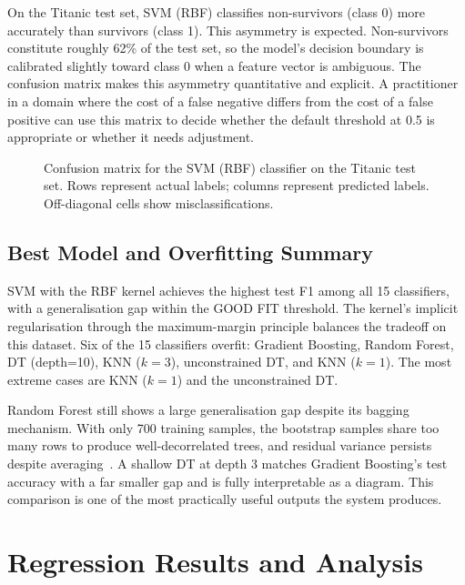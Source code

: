 \documentclass[conference]{IEEEtran}
\begin{document}
On the Titanic test set, SVM (RBF) classifies non-survivors (class 0) more accurately than survivors (class 1). This asymmetry is expected. Non-survivors constitute roughly 62\% of the test set, so the model's decision boundary is calibrated slightly toward class 0 when a feature vector is ambiguous. The confusion matrix makes this asymmetry quantitative and explicit. A practitioner in a domain where the cost of a false negative differs from the cost of a false positive can use this matrix to decide whether the default threshold at 0.5 is appropriate or whether it needs adjustment.

\begin{figure}[t]
    \centering
    \caption{Confusion matrix for the SVM (RBF) classifier on the Titanic test set. Rows represent actual labels; columns represent predicted labels. Off-diagonal cells show misclassifications.}
    \label{fig:svm_cm}
\end{figure}

\subsection{Best Model and Overfitting Summary}

SVM with the RBF kernel achieves the highest test F1 among all 15 classifiers, with a generalisation gap within the GOOD FIT threshold. The kernel's implicit regularisation through the maximum-margin principle balances the tradeoff on this dataset. Six of the 15 classifiers overfit: Gradient Boosting, Random Forest, DT (depth=10), KNN ($k=3$), unconstrained DT, and KNN ($k=1$). The most extreme cases are KNN ($k=1$) and the unconstrained DT.

Random Forest still shows a large generalisation gap despite its bagging mechanism. With only 700 training samples, the bootstrap samples share too many rows to produce well-decorrelated trees, and residual variance persists despite averaging~\cite{b12}. A shallow DT at depth 3 matches Gradient Boosting's test accuracy with a far smaller gap and is fully interpretable as a diagram. This comparison is one of the most practically useful outputs the system produces.

\section{Regression Results and Analysis}
\end{document}
